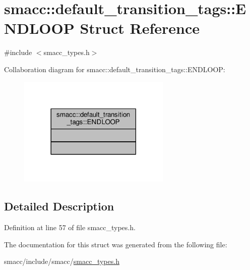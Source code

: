 \hypertarget{structsmacc_1_1default__transition__tags_1_1ENDLOOP}{}\section{smacc\+:\+:default\+\_\+transition\+\_\+tags\+:\+:E\+N\+D\+L\+O\+OP Struct Reference}
\label{structsmacc_1_1default__transition__tags_1_1ENDLOOP}


{\ttfamily \#include $<$smacc\+\_\+types.\+h$>$}



Collaboration diagram for smacc\+:\+:default\+\_\+transition\+\_\+tags\+:\+:E\+N\+D\+L\+O\+OP\+:\nopagebreak
\begin{figure}[H]
\begin{center}
\leavevmode
\includegraphics[width=206pt]{structsmacc_1_1default__transition__tags_1_1ENDLOOP__coll__graph}
\end{center}
\end{figure}


\subsection{Detailed Description}


Definition at line 57 of file smacc\+\_\+types.\+h.



The documentation for this struct was generated from the following file\+:\begin{DoxyCompactItemize}
\item 
smacc/include/smacc/\hyperlink{smacc__types_8h}{smacc\+\_\+types.\+h}\end{DoxyCompactItemize}
